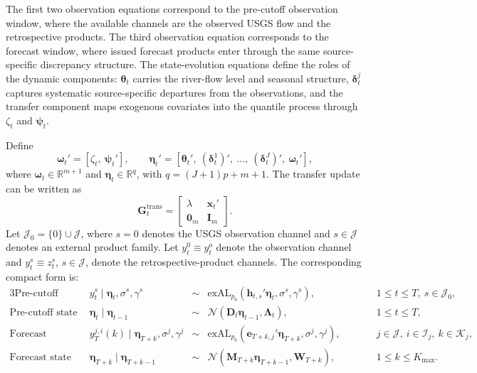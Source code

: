 \documentclass[APA,STIX1COL]{WileyNJD-v2}
\begin{document}
The first two observation equations correspond to the pre-cutoff observation window, where the available channels are the observed USGS flow and the retrospective products. The third observation equation corresponds to the forecast window, where issued forecast products enter through the same source-specific discrepancy structure. The state-evolution equations define the roles of the dynamic components: \(\boldsymbol{\theta}_t\) carries the river-flow level and seasonal structure, \(\boldsymbol{\delta}_t^j\) captures systematic source-specific departures from the observations, and the transfer component maps exogenous covariates into the quantile process through \(\zeta_t\) and \(\boldsymbol{\psi}_t\).

Define
\[
\boldsymbol{\omega}_t' = [\zeta_t,\ \boldsymbol{\psi}_t'], \qquad
\boldsymbol{\eta}_t' = [\boldsymbol{\theta}_t',\ (\boldsymbol{\delta}_t^1)',\ \ldots,\ (\boldsymbol{\delta}_t^J)',\ \boldsymbol{\omega}_t'],
\]
where \(\boldsymbol{\omega}_t \in \mathbb{R}^{m+1}\) and \(\boldsymbol{\eta}_t \in \mathbb{R}^{q}\), with \(q = (J+1)p + m + 1\). The transfer update can be written as
\[
\mathbf{G}^{\text{trans}}_t =
\begin{bmatrix}
\lambda & \mathbf{x}_t' \\
\mathbf{0}_m & \mathbf{I}_m
\end{bmatrix}.
\]
Let \(\mathcal{J}_0=\{0\}\cup\mathcal{J}\), where \(s=0\) denotes the USGS observation channel and \(s\in\mathcal{J}\) denotes an external product family. Let \(y_t^0 \equiv y_t^o\) denote the observation channel and \(y_t^s \equiv z_t^s\), \(s\in\mathcal{J}\), denote the retrospective-product channels. The corresponding compact form is:
\begin{alignat}{3}
\text{Pre-cutoff observations:}\quad&
y_t^s \mid \boldsymbol{\eta}_t, \sigma^s, \gamma^s
&\sim{}& \text{exAL}_{p_0}\!\left(\mathbf{h}_{t,s}' \boldsymbol{\eta}_t, \sigma^s, \gamma^s\right),
&\qquad& 1 \le t \le T,\ s \in \mathcal{J}_0, \label{eq:compact_est_obs}
\\
\text{Pre-cutoff state evolution:}\quad&
\boldsymbol{\eta}_t \mid \boldsymbol{\eta}_{t-1}
&\sim{}& \mathcal{N}\!\left(\boldsymbol{D}_t \boldsymbol{\eta}_{t-1}, \boldsymbol{\Lambda}_t\right),
&\qquad& 1 \le t \le T, \label{eq:compact_est_state}
\\
\text{Forecast observations:}\quad&
y_T^{j,i}(k) \mid \boldsymbol{\eta}_{T+k}, \sigma^j, \gamma^j
&\sim{}& \text{exAL}_{p_0}\!\left(\mathbf{e}_{T+k,j}' \boldsymbol{\eta}_{T+k}, \sigma^j, \gamma^j\right),
&\qquad& j \in \mathcal{J},\ i \in \mathcal{I}_j,\ k \in \mathcal{K}_j, \label{eq:compact_fc_obs}
\\
\text{Forecast state evolution:}\quad&
\boldsymbol{\eta}_{T+k} \mid \boldsymbol{\eta}_{T+k-1}
&\sim{}& \mathcal{N}\!\left(\boldsymbol{M}_{T+k} \boldsymbol{\eta}_{T+k-1}, \mathbf{W}_{T+k}\right),
&\qquad& 1 \le k \le K_{\max}. \label{eq:compact_fc_state}
\end{alignat}
\end{document}
